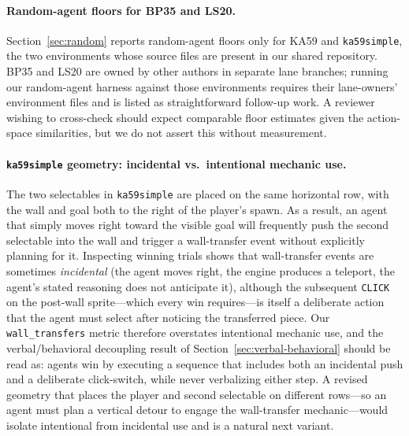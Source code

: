 \documentclass{article}
\begin{document}
\paragraph{Random-agent floors for BP35 and LS20.}
Section~\ref{sec:random} reports random-agent floors only for KA59 and \texttt{ka59simple}, the two environments whose source files are present in our shared repository. BP35 and LS20 are owned by other authors in separate lane branches; running our random-agent harness against those environments requires their lane-owners' environment files and is listed as straightforward follow-up work. A reviewer wishing to cross-check should expect comparable floor estimates given the action-space similarities, but we do not assert this without measurement.

\paragraph{\texttt{ka59simple} geometry: incidental vs.\ intentional mechanic use.}
The two selectables in \texttt{ka59simple} are placed on the same horizontal row, with the wall and goal both to the right of the player's spawn. As a result, an agent that simply moves right toward the visible goal will frequently push the second selectable into the wall and trigger a wall-transfer event without explicitly planning for it. Inspecting winning trials shows that wall-transfer events are sometimes \emph{incidental} (the agent moves right, the engine produces a teleport, the agent's stated reasoning does not anticipate it), although the subsequent \texttt{CLICK} on the post-wall sprite---which every win requires---is itself a deliberate action that the agent must select after noticing the transferred piece. Our \texttt{wall\_transfers} metric therefore overstates intentional mechanic use, and the verbal/behavioral decoupling result of Section~\ref{sec:verbal-behavioral} should be read as: agents win by executing a sequence that includes both an incidental push and a deliberate click-switch, while never verbalizing either step. A revised geometry that places the player and second selectable on different rows---so an agent must plan a vertical detour to engage the wall-transfer mechanic---would isolate intentional from incidental use and is a natural next variant.
\end{document}
